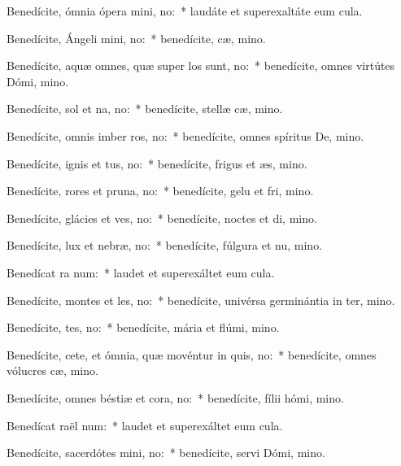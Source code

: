 \item Benedícite, ómnia ópera mini, no:~* laudáte et superexaltáte eum  cula.
\item Benedícite, Ángeli mini, no:~* benedícite, cæ, mino.
\item Benedícite, aquæ omnes, quæ super los sunt, no:~* benedícite, omnes virtútes Dómi, mino.
\item Benedícite, sol et na, no:~* benedícite, stellæ cæ, mino.
\item Benedícite, omnis imber  ros, no:~* benedícite, omnes spíritus De, mino.
\item Benedícite, ignis et tus, no:~* benedícite, frigus et æs, mino.
\item Benedícite, rores et pruna, no:~* benedícite, gelu et fri, mino.
\item Benedícite, glácies et ves, no:~* benedícite, noctes et di, mino.
\item Benedícite, lux et nebræ, no:~* benedícite, fúlgura et nu, mino.
\item Benedícat ra num:~* laudet et superexáltet eum  cula.
\item Benedícite, montes et les, no:~* benedícite, univérsa germinántia in ter, mino.
\item Benedícite, tes, no:~* benedícite, mária et flúmi, mino.
\item Benedícite, cete, et ómnia, quæ movéntur in quis, no:~* benedícite, omnes vólucres cæ, mino.
\item Benedícite, omnes béstiæ et cora, no:~* benedícite, fílii hómi, mino.
\item Benedícat raël num:~* laudet et superexáltet eum  cula.
\item Benedícite, sacerdótes mini, no:~* benedícite, servi Dómi, mino.
